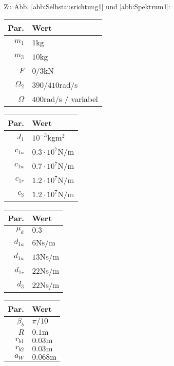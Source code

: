 Zu Abb. \ref{abb:Selbstausrichtung1} und \ref{abb:Spektrum1}:
\begin{center}
\begin{tabular}{r|l}
Par. &Wert\\\hline
$m_1$&$1$kg\\
$m_3$&$10$kg\\
$F$&$0/3$kN\\
$\Omega_2$&$390/410$rad/s\\
$\Omega$&$400$rad/s / variabel
\end{tabular} \hfill
\begin{tabular}{r|l}
Par. &Wert\\\hline
$J_1$&$10^{-3}$kgm$^{2}$\\
$c_{1a}$&$0.3\cdot10^{7}$N/m\\
$c_{1n}$&$0.7\cdot10^{7}$N/m \\
$c_{1r}$ &$1.2\cdot10^{7}$N/m\\
$c_{3}$ & $1.2\cdot10^{7}$N/m
\end{tabular} \hfill
\begin{tabular}{r|l}
Par. &Wert\\\hline
$\mu_k$& $0.3$\\
$d_{1a}$&$6$Ns/m\\
$d_{1n}$&$13$Ns/m \\
$d_{1r}$ &$22$Ns/m\\
$d_{3}$ & $22$Ns/m
\end{tabular} \hfill
\begin{tabular}{r|l}
Par. &Wert\\\hline
$\beta_b$& $\pi/10$\\
$R$&$0.1\textrm{m}$ \\
$r_{b1}$&$ 0.03\textrm{m}$\\
$r_{b2}$&$ 0.03\textrm{m}$\\
$a_{W}$&$ 0.068\textrm{m}$
\end{tabular}
\end{center}

